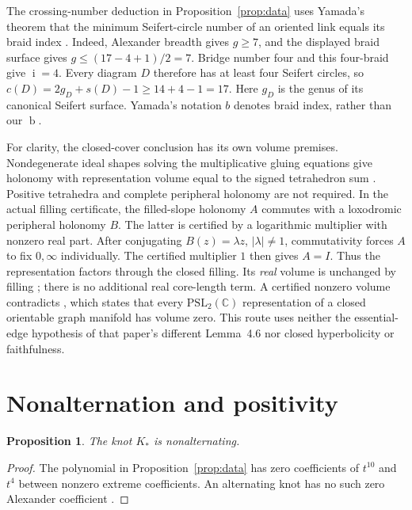 \documentclass[11pt]{article}
\newtheorem{proposition}[theorem]{Proposition}
\newcommand{\br}{\operatorname{b}}
\newcommand{\bi}{\operatorname{i}}
\begin{document}
The crossing-number deduction in Proposition~\ref{prop:data}
uses Yamada's theorem that the minimum Seifert-circle number of an
oriented link equals its braid index \cite[Theorem~3, p.~347]{yamada}.
Indeed, Alexander breadth gives $g\ge7$, and the displayed braid
surface gives $g\le(17-4+1)/2=7$. Bridge number four and this
four-braid give $\bi=4$. Every diagram $D$ therefore has at least
four Seifert circles, so
$c(D)=2g_D+s(D)-1\ge14+4-1=17$.
Here $g_D$ is the genus of its canonical Seifert surface.
Yamada's notation $b$ denotes braid index, rather than our $\br$.

For clarity, the closed-cover conclusion has its own volume
premises. Nondegenerate ideal shapes solving the multiplicative
gluing equations give holonomy with representation volume equal
to the signed tetrahedron sum \cite[Remark~4.4, p.~433;
Corollary~4.14 and Remark~4.15, p.~437]{franc}.
Positive tetrahedra and complete peripheral holonomy are not required.
In the actual filling certificate, the filled-slope holonomy $A$
commutes with a loxodromic peripheral holonomy $B$. The latter is
certified by a logarithmic multiplier with nonzero real part.
After conjugating $B(z)=\lambda z$, $|\lambda|\ne1$,
commutativity forces $A$ to fix $0,\infty$ individually.
The certified multiplier $1$ then gives $A=I$.
Thus the representation factors through the closed filling.
Its \emph{real} volume is unchanged by filling
\cite[Proposition~4.17, p.~437]{franc}; there is no additional real
core-length term. A certified nonzero volume contradicts
\cite[Lemma~4.10, p.~11 of the retained preprint]{lty}, which
states that every $\mathrm{PSL}_2(\mathbb C)$ representation of a
closed orientable graph manifold has volume zero.
This route uses neither the essential-edge hypothesis of that
paper's different Lemma~4.6 nor closed hyperbolicity or faithfulness.

\section{Nonalternation and positivity}

\begin{proposition}\label{prop:nonalternating}
The knot $K_*$ is nonalternating.
\end{proposition}
\begin{proof}
The polynomial in Proposition~\ref{prop:data} has zero coefficients
of $t^{10}$ and $t^4$ between nonzero extreme coefficients.
An alternating knot has no such zero Alexander coefficient
\cite[Theorem~1.1, p.~181]{murasugi}.
\end{proof}
\end{document}
